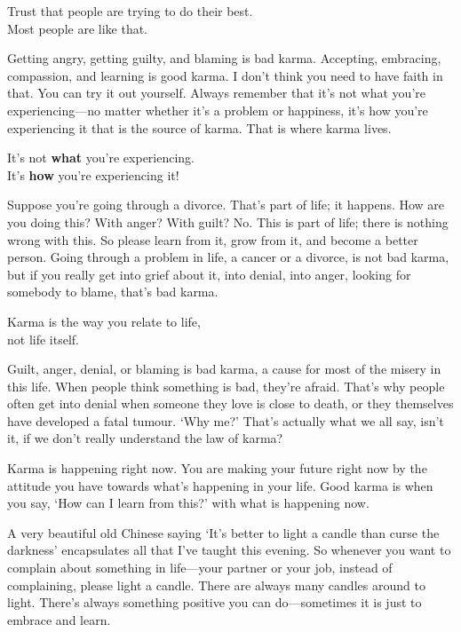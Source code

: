 \documentclass[12pt, openany]{book}
\newenvironment{aphorism}%
{%
\begin{center}\begin{itshape}
}%
{\end{itshape}\end{center}
}%
\begin{document}
\begin{aphorism}
Trust that people are trying to do their best.\\  
Most people are like that.
\end{aphorism}

Getting angry, getting guilty, and blaming is bad karma. Accepting, embracing, compassion, and learning is good karma. I don’t think you need to have faith in that. You can try it out yourself. Always remember that it’s not what you’re experiencing—no matter whether it’s a problem or happiness, it’s how you’re experiencing it that is the source of karma. That is where karma lives. 

\begin{aphorism}
It’s not \textbf{what} you’re experiencing.\\ 
It’s \textbf{how} you’re experiencing it!
\end{aphorism}

Suppose you’re going through a divorce. That’s part of life; it happens. How are you doing this? With anger? With guilt? No. This is part of life; there is nothing wrong with this. So please learn from it, grow from it, and become a better person. Going through a problem in life, a cancer or a divorce, is not bad karma, but if you really get into grief about it, into denial, into anger, looking for somebody to blame, that’s bad karma. 

\begin{aphorism}
Karma is the way you relate to life,\\  
not life itself.
\end{aphorism}

Guilt, anger, denial, or blaming is bad karma, a cause for most of the misery in this life. When people think something is bad, they’re afraid. That’s why people often get into denial when someone they love is close to death, or they themselves have developed a fatal tumour. ‘Why me?’ That’s actually what we all say, isn’t it, if we don’t really understand the law of karma? 

Karma is happening right now. You are making your future right now by the attitude you have towards what’s happening in your life. Good karma is when you say, ‘How can I learn from this?’ with what is happening now. 

A very beautiful old Chinese saying ‘It’s better to light a candle than curse the darkness’ encapsulates all that I’ve taught this evening. So whenever you want to complain about something in life—your partner or your job, instead of complaining, please light a candle. There are always many candles around to light. There’s always something positive you can do—sometimes it is just to embrace and learn. 
\end{document}
